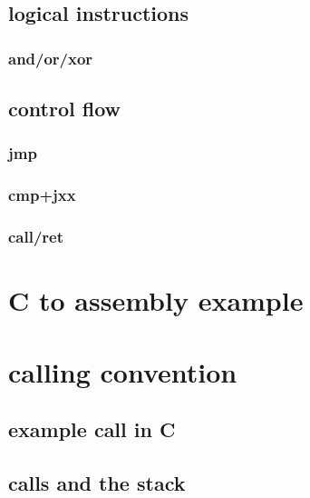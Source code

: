 \subsection{logical instructions}

\subsubsection{and/or/xor}



\subsection{control flow}

\subsubsection{jmp}



\subsubsection{cmp+jxx}



\subsubsection{call/ret}



\section{C to assembly example}



\section{calling convention}

\subsection{example call in C}

\subsection{calls and the stack}

